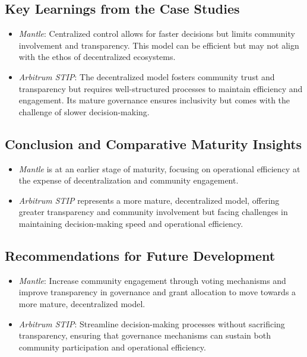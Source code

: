 \documentclass[a4,10pt]{article}
\begin{document}
\subsection{Key Learnings from the Case Studies}\label{sec_15.7}
\begin{itemize}
    \item \textit{Mantle}: Centralized control allows for faster decisions but limits community involvement and transparency. This model can be efficient but may not align with the ethos of decentralized ecosystems.
    \item \textit{Arbitrum STIP}: The decentralized model fosters community trust and transparency but requires well-structured processes to maintain efficiency and engagement. Its mature governance ensures inclusivity but comes with the challenge of slower decision-making.
\end{itemize}

\subsection{Conclusion and Comparative Maturity Insights}\label{sec_15.8}
\begin{itemize}
    \item \textit{Mantle} is at an earlier stage of maturity, focusing on operational efficiency at the expense of decentralization and community engagement.
    \item \textit{Arbitrum STIP} represents a more mature, decentralized model, offering greater transparency and community involvement but facing challenges in maintaining decision-making speed and operational efficiency.
\end{itemize}

\subsection{Recommendations for Future Development}\label{sec_15.9}
\begin{itemize}
    \item \textit{Mantle}: Increase community engagement through voting mechanisms and improve transparency in governance and grant allocation to move towards a more mature, decentralized model.
    \item \textit{Arbitrum STIP}: Streamline decision-making processes without sacrificing transparency, ensuring that governance mechanisms can sustain both community participation and operational efficiency.
\end{itemize}
\newpage
\end{document}
